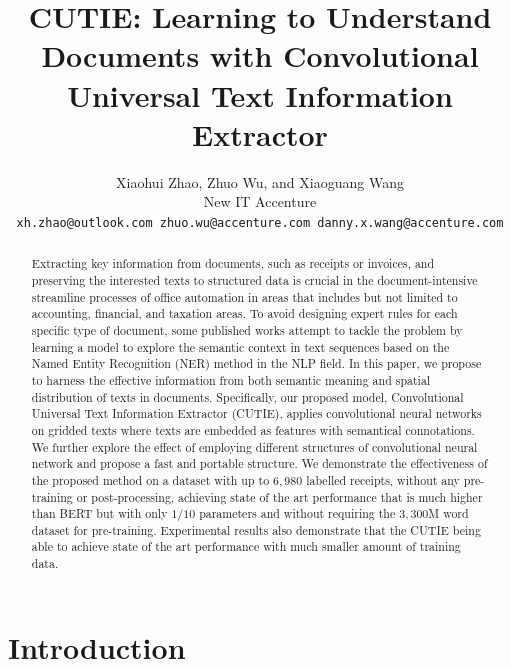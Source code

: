 \documentclass[10pt,twocolumn,letterpaper]{article}
\begin{document}
\title{CUTIE: Learning to Understand Documents with Convolutional Universal Text Information Extractor}

\author{
  Xiaohui Zhao, Zhuo Wu, and Xiaoguang Wang \\
  New IT Accenture \\
{\tt\small xh.zhao@outlook.com zhuo.wu@accenture.com danny.x.wang@accenture.com}
}

\maketitle

\begin{abstract}
   Extracting key information from documents, such as receipts or invoices, and preserving the interested texts to structured data is crucial in the document-intensive streamline processes of office automation in areas that includes but not limited to accounting, financial, and taxation areas. To avoid designing expert rules for each specific type of document, some published works attempt to tackle the problem by learning a model to explore the semantic context in text sequences based on the Named Entity Recognition (NER) method in the NLP field. In this paper, we propose to harness the effective information from both semantic meaning and spatial distribution of texts in documents. Specifically, our proposed model, Convolutional Universal Text Information Extractor (CUTIE), applies convolutional neural networks on gridded texts where texts are embedded as features with semantical connotations. We further explore the effect of employing different structures of convolutional neural network and propose a fast and portable structure. We demonstrate the effectiveness of the proposed method on a dataset with up to $6,980$ labelled receipts, without any pre-training or post-processing, achieving state of the art performance that is much higher than BERT but with only $1/10$ parameters and without requiring the $3,300$M word dataset for pre-training. Experimental results also demonstrate that the CUTIE being able to achieve state of the art performance with much smaller amount of training data.
\end{abstract}

\section{Introduction}
\end{document}
